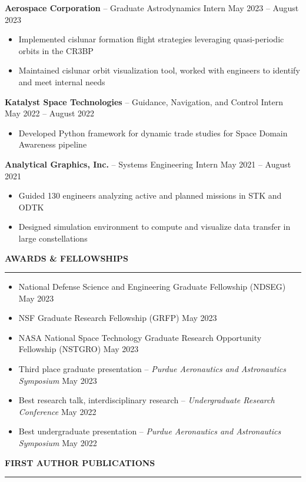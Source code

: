\documentclass[11pt, a4paper]{article}
\newcommand{\sectiontitle}[1]{{\Large \textbf{#1}}\vspace{0.5em}\hrule\vspace{0.5em}}
\begin{document}
\textbf{Aerospace Corporation} -- Graduate Astrodynamics Intern \hfill May 2023 -- August 2023
\begin{itemize}[noitemsep]
    \item Implemented cislunar formation flight strategies leveraging quasi-periodic orbits in the CR3BP
    \item Maintained cislunar orbit visualization tool, worked with engineers to identify and meet internal needs
\end{itemize}

\textbf{Katalyst Space Technologies} -- Guidance, Navigation, and Control Intern \hfill May 2022 -- August 2022
\begin{itemize}[noitemsep]
    \item Developed Python framework for dynamic trade studies for Space Domain Awareness pipeline
\end{itemize}

\textbf{Analytical Graphics, Inc.} -- Systems Engineering Intern \hfill May 2021 -- August 2021
\begin{itemize}[noitemsep]
    \item Guided 130 engineers analyzing active and planned missions in STK and ODTK
    \item Designed simulation environment to compute and visualize data transfer in large constellations
\end{itemize}

\sectiontitle{AWARDS \& FELLOWSHIPS}
\begin{itemize}[noitemsep]
    \item National Defense Science and Engineering Graduate Fellowship (NDSEG) \hfill May 2023
    \item NSF Graduate Research Fellowship (GRFP) \hfill May 2023
    \item NASA National Space Technology Graduate Research Opportunity Fellowship (NSTGRO) \hfill May 2023
    \item Third place graduate presentation -- \textit{Purdue Aeronautics and Astronautics Symposium} \hfill May 2023
    \item Best research talk, interdisciplinary research -- \textit{Undergraduate Research Conference} \hfill May 2022
    \item Best undergraduate presentation -- \textit{Purdue Aeronautics and Astronautics Symposium} \hfill May 2022
\end{itemize}

\sectiontitle{FIRST AUTHOR PUBLICATIONS}
\nocite{*}
\printbibliography[heading=none]
\end{document}
